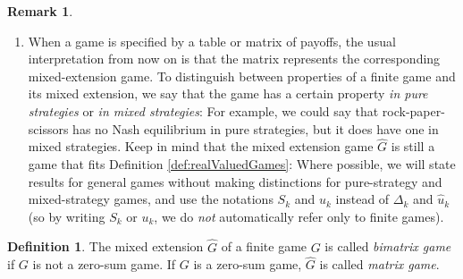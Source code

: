 \documentclass[a4paper,DIV=11]{scrreprt}
\theoremstyle{definition}
\newtheorem{defn}[thm]{Definition} %
\newtheorem{rem}[thm]{Remark}
\begin{document}
\begin{rem}
\begin{enumerate}
            \item 
            \label{item:mixedExtensionsRemark-matrixBimatrixGamesRemark}
            When a game is specified by a table or matrix of payoffs, the usual interpretation from now on is that the matrix represents the corresponding mixed-extension game.
            To distinguish between properties of a finite game and its mixed extension, we say that the game has a certain property \emph{in pure strategies} or \emph{in mixed strategies}:
            For example, we could say that rock-paper-scissors has no Nash equilibrium in pure strategies, but it does have one in mixed strategies.
            Keep in mind that the mixed extension game $\hat{G}$ is still a game that fits Definition \ref{def:realValuedGames}:
            Where possible, we will state results for general games without making distinctions for pure-strategy and mixed-strategy games, and use the notations $S_k$ and $u_k$ instead of $\Delta_k$ and $\hat{u}_k$ (so by writing $S_k$ or $u_k$, we do \emph{not} automatically refer only to finite games).
        \end{enumerate}
    \end{rem}

    \begin{defn}
        The mixed extension $\hat{G}$ of a finite game $G$ is called \emph{bimatrix game} if $G$ is not a zero-sum game.
        If $G$ is a zero-sum game, $\hat{G}$ is called \emph{matrix game}.
    \end{defn}
\end{document}
